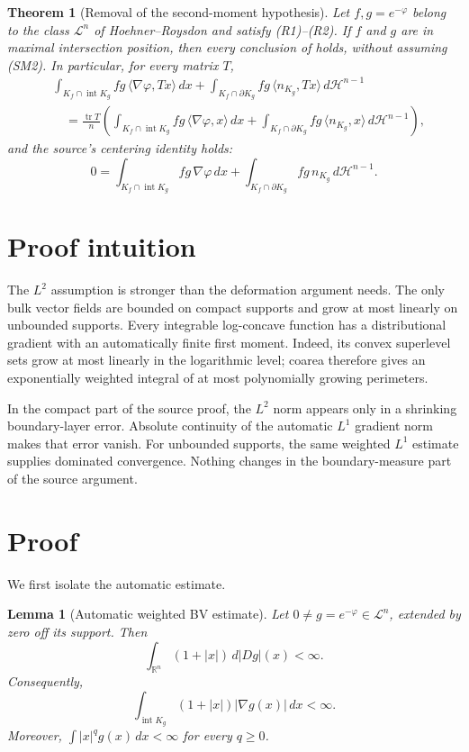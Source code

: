 \documentclass[11pt]{article}
\newtheorem{theorem}{Theorem}
\newtheorem{lemma}{Lemma}
\newcommand{\R}{\mathbb R}
\newcommand{\cH}{\mathcal H}
\newcommand{\Tr}{\operatorname{tr}}
\newcommand{\Int}{\operatorname{int}}
\begin{document}
\begin{theorem}[Removal of the second-moment hypothesis]\label{thm:main}
Let $f,g=e^{-\varphi}$ belong to the class $\mathcal L^n$ of Hoehner--Roysdon
and satisfy \textup{(R1)}--\textup{(R2)}.  If $f$ and $g$ are in maximal
intersection position, then every conclusion of \cite[Theorem 11]{HR} holds,
without assuming \textup{(SM2)}.  In particular, for every matrix $T$,
\begin{align*}
&\int_{K_f\cap\Int K_g}fg\,\langle\nabla\varphi,Tx\rangle\,dx
 +\int_{K_f\cap\partial K_g}fg\,\langle n_{K_g},Tx\rangle\,d\cH^{n-1}\\
&\quad=\frac{\Tr T}{n}\left(
 \int_{K_f\cap\Int K_g}fg\,\langle\nabla\varphi,x\rangle\,dx
 +\int_{K_f\cap\partial K_g}fg\,\langle n_{K_g},x\rangle\,d\cH^{n-1}
 \right),
\end{align*}
and the source's centering identity holds:
\[
 0=\int_{K_f\cap\Int K_g}fg\,\nabla\varphi\,dx
   +\int_{K_f\cap\partial K_g}fg\,n_{K_g}\,d\cH^{n-1}.
\]
\end{theorem}

\section{Proof intuition}
The $L^2$ assumption is stronger than the deformation argument needs.  The
only bulk vector fields are bounded on compact supports and grow at most
linearly on unbounded supports.  Every integrable log-concave function has a
distributional gradient with an automatically finite first moment.  Indeed,
its convex superlevel sets grow at most linearly in the logarithmic level;
coarea therefore gives an exponentially weighted integral of at most
polynomially growing perimeters.

In the compact part of the source proof, the $L^2$ norm appears only in a
shrinking boundary-layer error.  Absolute continuity of the automatic $L^1$
gradient norm makes that error vanish.  For unbounded supports, the same
weighted $L^1$ estimate supplies dominated convergence.  Nothing changes in
the boundary-measure part of the source argument.

\section{Proof}
We first isolate the automatic estimate.

\begin{lemma}[Automatic weighted BV estimate]\label{lem:bv}
Let $0\ne g=e^{-\varphi}\in\mathcal L^n$, extended by zero off its support.
Then
\[
  \int_{\R^n}(1+|x|)\,d|Dg|(x)<\infty.
  \tag{8}
\]
Consequently,
\[
 \int_{\Int K_g}(1+|x|)|\nabla g(x)|\,dx<\infty.
 \tag{9}
\]
Moreover, $\int |x|^qg(x)\,dx<\infty$ for every $q\ge0$.
\end{lemma}
\end{document}

